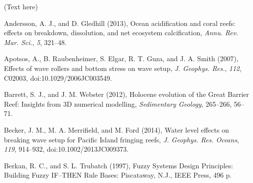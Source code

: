 \documentclass[default,jgrga]{agutex2015}
\begin{document}
\begin{article}
\begin{acknowledgments}
(Text here)
\end{acknowledgments}

%
%
%
%
%
%
%
%
%

\begin{thebibliography}{}

Andersson, A. J., and D. Gledhill (2013), Ocean acidification and coral reefs: effects on breakdown, dissolution, and net ecosystem calcification, \textit{Annu. Rev. Mar. Sci.}, \textit{5}, 321--48.

Apotsos, A., B. Raubenheimer, S. Elgar, R. T. Guza, and J. A. Smith (2007), Effects of wave rollers and bottom stress on wave setup, \textit{J. Geophys. Res.}, \textit{112}, C02003, doi:10.1029/2006JC003549.

Barrett, S. J., and J. M. Webster (2012), Holocene evolution of the Great Barrier Reef: Insights from 3D numerical modelling, \textit{Sedimentary Geology}, 265--266, 56--71.

Becker, J. M., M. A. Merrifield, and M. Ford (2014), Water level effects on breaking wave setup for Pacific Island fringing reefs, \textit{J. Geophys. Res. Oceans}, \textit{119}, 914--932, doi:10.1002/2013JC009373.

Berkan, R. C., and S. L. Trubatch (1997), Fuzzy Systems Design Principles: Building Fuzzy IF–THEN Rule Bases: Piscataway, N.J., IEEE Press, 496 p.


\end{thebibliography}
\end{article}
\end{document}
